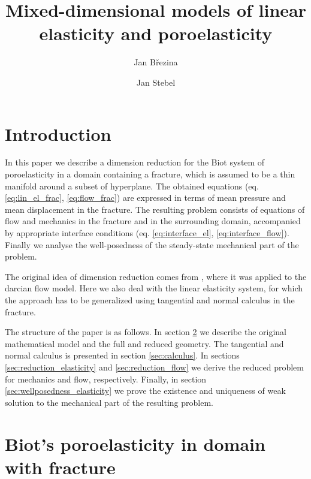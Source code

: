 \documentclass[a4paper]{article}
\begin{document}
\title{Mixed-dimensional models of linear elasticity and poroelasticity}
\author{Jan Březina}
\author{Jan Stebel}
\maketitle


\section{Introduction}

In this paper we describe a dimension reduction for the Biot system of poroelasticity in a domain containing a fracture, which is assumed to be a thin manifold around a subset of hyperplane.
The obtained equations (eq. \eqref{eq:lin_el_frac}, \eqref{eq:flow_frac}) are expressed in terms of mean pressure and mean displacement in the fracture.
The resulting problem consists of equations of flow and mechanics in the fracture and in the surrounding domain, accompanied by appropriate interface conditions (eq. \eqref{eq:interface_el}, \eqref{eq:interface_flow}).
Finally we analyse the well-posedness of the steady-state mechanical part of the problem.

The original idea of dimension reduction comes from \cite{martin_modeling_2005}, where it was applied to the darcian flow model.
Here we also deal with the linear elasticity system, for which the approach has to be generalized using tangential and normal calculus in the fracture.

The structure of the paper is as follows.
In section \ref{sec:model} we describe the original mathematical model and the full and reduced geometry.
The tangential and normal calculus is presented in section \ref{sec:calculus}.
In sections \ref{sec:reduction_elasticity} and \ref{sec:reduction_flow} we derive the reduced problem for mechanics and flow, respectively.
Finally, in section \ref{sec:wellposedness_elasticity} we prove the existence and uniqueness of weak solution to the mechanical part of the resulting problem.


\section{Biot's poroelasticity in domain with fracture}\label{sec:model}
\end{document}
